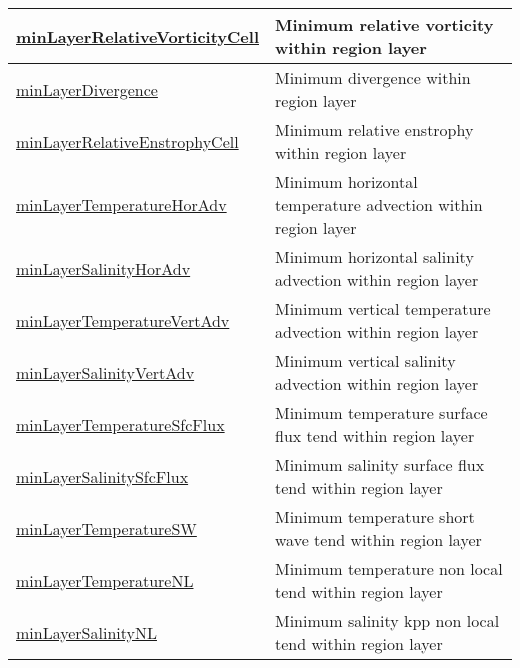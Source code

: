 {\begin{center}
\begin{longtable}{| p{2.0in} | p{4.0in} |}
    \hline
    \hyperref[subsec:var_sec_layerVolumeWeightedAverageAM_minLayerRelativeVorticityCell]{minLayerRelativeVorticityCell} & Minimum relative vorticity within region layer \\
    \hline
    \hyperref[subsec:var_sec_layerVolumeWeightedAverageAM_minLayerDivergence]{minLayerDivergence} & Minimum divergence within region layer \\
    \hline
    \hyperref[subsec:var_sec_layerVolumeWeightedAverageAM_minLayerRelativeEnstrophyCell]{minLayerRelativeEnstrophyCell} & Minimum relative enstrophy within region layer \\
    \hline
    \hyperref[subsec:var_sec_layerVolumeWeightedAverageAM_minLayerTemperatureHorAdv]{minLayerTemperatureHorAdv} & Minimum horizontal temperature advection within region layer \\
    \hline
    \hyperref[subsec:var_sec_layerVolumeWeightedAverageAM_minLayerSalinityHorAdv]{minLayerSalinityHorAdv} & Minimum horizontal salinity advection within region layer \\
    \hline
    \hyperref[subsec:var_sec_layerVolumeWeightedAverageAM_minLayerTemperatureVertAdv]{minLayerTemperatureVertAdv} & Minimum vertical temperature advection within region layer \\
    \hline
    \hyperref[subsec:var_sec_layerVolumeWeightedAverageAM_minLayerSalinityVertAdv]{minLayerSalinityVertAdv} & Minimum vertical salinity advection within region layer \\
    \hline
    \hyperref[subsec:var_sec_layerVolumeWeightedAverageAM_minLayerTemperatureSfcFlux]{minLayerTemperatureSfcFlux} & Minimum temperature surface flux tend within region layer \\
    \hline
    \hyperref[subsec:var_sec_layerVolumeWeightedAverageAM_minLayerSalinitySfcFlux]{minLayerSalinitySfcFlux} & Minimum salinity surface flux tend within region layer \\
    \hline
    \hyperref[subsec:var_sec_layerVolumeWeightedAverageAM_minLayerTemperatureSW]{minLayerTemperatureSW} & Minimum temperature short wave tend within region layer \\
    \hline
    \hyperref[subsec:var_sec_layerVolumeWeightedAverageAM_minLayerTemperatureNL]{minLayerTemperatureNL} & Minimum temperature non local tend within region layer \\
    \hline
    \hyperref[subsec:var_sec_layerVolumeWeightedAverageAM_minLayerSalinityNL]{minLayerSalinityNL} & Minimum salinity kpp non local tend within region layer \\

\end{longtable}
\end{center}}
